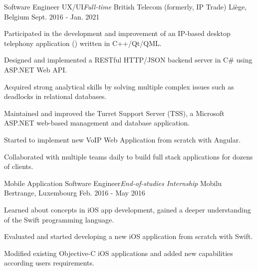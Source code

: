 \begin{cventries}
  \cventry
    {Software Engineer UX/UI{\enskip\cdotp\enskip}\it{Full-time}} %
    {British Telecom (formerly, IP Trade)} %
    {Liège, Belgium} %
    {Sept. 2016 - Jan. 2021} %
    {
      \begin{cvitems} %
        \item{Participated in the development and improvement of an IP-based desktop telephony application () written in C++/Qt/QML.}
        \item{Designed and implemented a RESTful HTTP/JSON backend server in C\# using ASP.NET Web API.}
        \item{Acquired strong analytical skills by solving multiple complex issues such as deadlocks in relational databases.}
        \item{Maintained and improved the Turret Support Server (TSS), a Microsoft ASP.NET web-based management and database application.}
        \item{Started to implement new VoIP Web Application from scratch with Angular.}
        \item{Collaborated with multiple teams daily to build full stack applications for dozens of clients.}
      \end{cvitems}
    }

  \cventry
    {Mobile Application Software Engineer{\enskip\cdotp\enskip}\it{End-of-studies Internship}} %
    {Mobilu} %
    {Bertrange, Luxembourg} %
    {Feb. 2016 - May 2016} %
    {
      \begin{cvitems} %
        \item{Learned about concepts in iOS app development, gained a deeper understanding of the Swift programming language.}
        \item{Evaluated and started developing a new iOS application from scratch with Swift.}
        \item{Modified existing Objective-C iOS applications and added new capabilities according users requirements.}
      \end{cvitems}
    }


\end{cventries}
